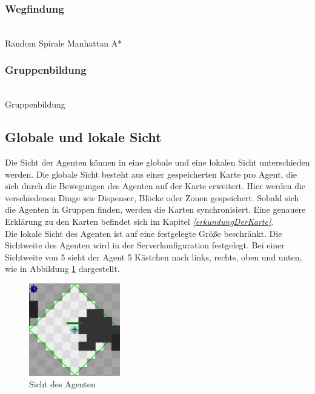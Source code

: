 \subsubsection{Wegfindung} \label{kap:wegfindung} ~\\
Random \newline
Spirale \newline
Manhattan \newline
A*

\subsubsection{Gruppenbildung} \label{kap:Gruppenbildung} ~\\

Gruppenbildung

\subsection{Globale und lokale Sicht}
Die Sicht der Agenten können in eine globale und eine lokalen Sicht unterschieden werden. Die globale Sicht besteht aus einer gespeicherten Karte pro Agent, die sich durch die Bewegungen des Agenten auf der Karte erweitert. Hier werden die verschiedenen Dinge wie Dispenser, Blöcke oder Zonen gespeichert. Sobald sich die Agenten in Gruppen finden, werden die Karten synchronisiert. Eine genauere Erklärung zu den Karten befindet sich im Kapitel \textit{\ref{erkundungDerKarte}}.\\

Die lokale Sicht des Agenten ist auf eine festgelegte Größe beschränkt. Die Sichtweite des Agenten wird in der Serverkonfiguration festgelegt. Bei einer Sichtweite von 5 sieht der Agent 5 Kästchen nach links, rechts, oben und unten, wie in Abbildung \ref{fig:agentensicht} dargestellt.
\begin{figure}
	\centering
	\includegraphics[width=150px]{bilder/agentensicht}
	\caption{Sicht des Agenten}
	\label{fig:agentensicht}
\end{figure}

